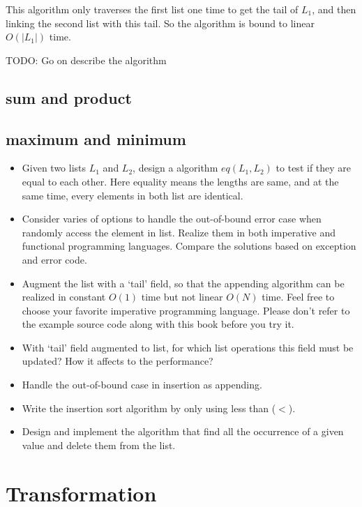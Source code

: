 \documentclass{article}
\begin{document}
This algorithm only traverses the first list one time to get the tail of $L_1$, and then linking the second list
with this tail. So the algorithm is bound to linear $O(|L_1|)$ time.

TODO: Go on describe the algorithm

\subsection{sum and product}

\subsection{maximum and minimum}

\begin{Exercise}
\begin{itemize}
\item Given two lists $L_1$ and $L_2$, design a algorithm $eq(L_1, L_2)$ to test if they are equal to each other.
Here equality means the lengths are same, and at the same time, every elements in both list are identical.
\item Consider varies of options to handle the out-of-bound error case when randomly access the element in list. Realize
them in both imperative and functional programming languages. Compare the solutions based on exception and error code.
\item Augment the list with a `tail' field, so that the appending algorithm can be realized in constant $O(1)$ time but
not linear $O(N)$ time. Feel free to choose your favorite imperative programming language. Please don't refer to the
example source code along with this book before you try it.
\item With `tail' field augmented to list, for which list operations this field must be updated? How it affects to the
performance?
\item Handle the out-of-bound case in insertion as appending.
\item Write the insertion sort algorithm by only using less than ($<$).
\item Design and implement the algorithm that find all the occurrence of a given value and delete them from the list.
\end{itemize}
\end{Exercise}

\section{Transformation}
\end{document}
